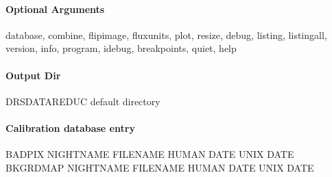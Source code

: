 \documentclass[a4paper,10pt,english]{report}
\begin{document}
\paragraph{Optional Arguments}
\label{\detokenize{user/spirou/recipes/bad_pixel:optional-arguments}}
\begin{sphinxVerbatim}[commandchars=\\\{\}]
\PYGZhy{}\PYGZhy{}database, \PYGZhy{}\PYGZhy{}combine, \PYGZhy{}\PYGZhy{}flipimage, \PYGZhy{}\PYGZhy{}fluxunits, \PYGZhy{}\PYGZhy{}plot, \PYGZhy{}\PYGZhy{}resize,
\PYGZhy{}\PYGZhy{}debug, \PYGZhy{}\PYGZhy{}listing, \PYGZhy{}\PYGZhy{}listingall, \PYGZhy{}\PYGZhy{}version, \PYGZhy{}\PYGZhy{}info,
\PYGZhy{}\PYGZhy{}program, \PYGZhy{}\PYGZhy{}idebug, \PYGZhy{}\PYGZhy{}breakpoints, \PYGZhy{}\PYGZhy{}quiet, \PYGZhy{}\PYGZhy{}help
\end{sphinxVerbatim}


\paragraph{Output Dir}
\label{\detokenize{user/spirou/recipes/bad_pixel:output-dir}}
\begin{sphinxVerbatim}[commandchars=\\\{\}]
DRS\PYGZus{}DATA\PYGZus{}REDUC    default  directory
\end{sphinxVerbatim}


\paragraph{Calibration database entry}
\label{\detokenize{user/spirou/recipes/bad_pixel:calibration-database-entry}}
\begin{sphinxVerbatim}[commandchars=\\\{\}]
BADPIX NIGHT\PYGZus{}NAME FILENAME HUMAN DATE UNIX DATE
BKGRDMAP NIGHT\PYGZus{}NAME FILENAME HUMAN DATE UNIX DATE
\end{sphinxVerbatim}
\end{document}
